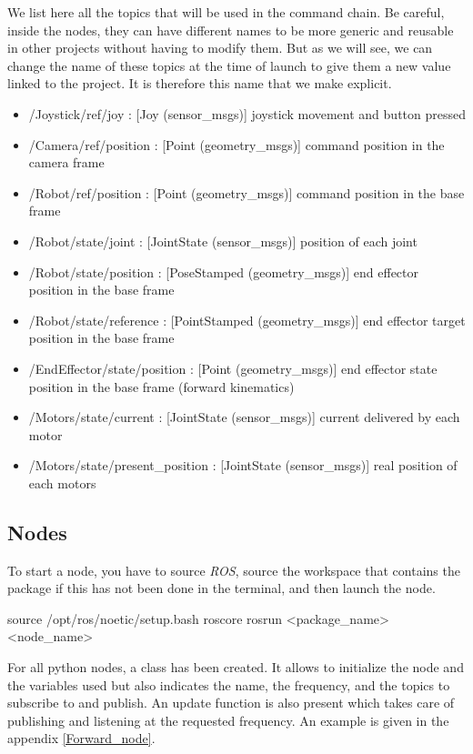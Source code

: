 We list here all the topics that will be used in the command chain. Be careful, inside the nodes, they can have different names to be more generic and reusable in other projects without having to modify them. But as we will see, we can change the name of these topics at the time of launch to give them a new value linked to the project. It is therefore this name that we make explicit. 
\begin{itemize}
    \item /Joystick/ref/joy : [Joy (sensor\_msgs)] joystick movement and button pressed
    \item /Camera/ref/position : [Point (geometry\_msgs)] command position in the camera frame
    \item /Robot/ref/position : [Point (geometry\_msgs)] command position in the base frame
    \item /Robot/state/joint : [JointState (sensor\_msgs)] position of each joint
    \item /Robot/state/position : [PoseStamped (geometry\_msgs)] end effector position in the base frame
    \item /Robot/state/reference : [PointStamped (geometry\_msgs)] end effector target position in the base frame
    \item /EndEffector/state/position : [Point (geometry\_msgs)] end effector state position in the base frame (forward kinematics)
    \item /Motors/state/current : [JointState (sensor\_msgs)] current delivered by each motor
    \item /Motors/state/present\_position : [JointState (sensor\_msgs)] real position of each motors
\end{itemize}

\subsection{Nodes}
To start a node, you have to source \textit{ROS}, source the workspace that contains the package if this has not been done in the terminal, and then launch the node.
\begin{commandshell}
    source /opt/ros/noetic/setup.bash
    roscore
    rosrun <package_name> <node_name>
\end{commandshell}

\bigbreak
For all python nodes, a class has been created. It allows to initialize the node and the variables used but also indicates the name, the frequency, and the topics to subscribe to and publish. An update function is also present which takes care of publishing and listening at the requested frequency. An example is given in the appendix \ref{Forward_node}.

